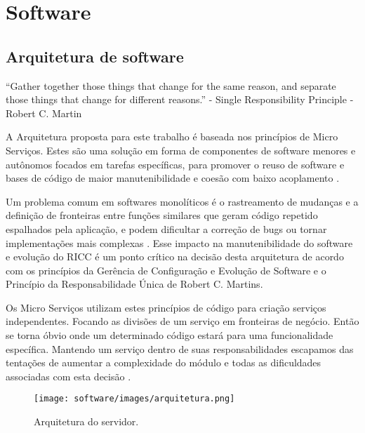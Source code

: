 \chapter[Software]{Software}
    \section{Arquitetura de software}

	\begin{flushright}
		\begin{minipage}[c]{.65\textwidth}
		
		
		{\small “Gather together those things that change for the same reason, and separate those things that change for different reasons.” - Single Responsibility Principle - Robert C. Martin}
		
		
		\end{minipage}
	\end{flushright}

    A Arquitetura proposta para este trabalho é baseada nos princípios de Micro Serviços. Estes são uma solução em forma de componentes de software menores e autônomos focados em tarefas específicas, para promover o reuso de software e bases de código de maior manutenibilidade e coesão com baixo acoplamento \cite{newman_2018}.

    Um problema comum em softwares monolíticos é o rastreamento de mudanças e a definição de fronteiras entre funções similares que geram código repetido espalhados pela aplicação, e podem dificultar a correção de bugs ou tornar implementações mais complexas \cite{newman_2018}. Esse impacto na manutenibilidade do software e evolução do RICC é um ponto crítico na decisão desta arquitetura de acordo com os princípios da Gerência de Configuração e Evolução de Software \cite{gces} e o Princípio da Responsabilidade Única de Robert C. Martins.

    Os Micro Serviços utilizam estes princípios de código para criação serviços independentes. Focando as divisões de um serviço em fronteiras de negócio. Então se torna óbvio onde um determinado código estará para uma funcionalidade específica. Mantendo um serviço dentro de suas responsabilidades escapamos das tentações de aumentar a complexidade do módulo e todas as dificuldades associadas com esta decisão \cite{newman_2018}.

    \begin{figure}[H]
        \texttt{[image: software/images/arquitetura.png]}
        \caption{Arquitetura do servidor.}
        \label{fig:arquitetura}
    \end{figure}

